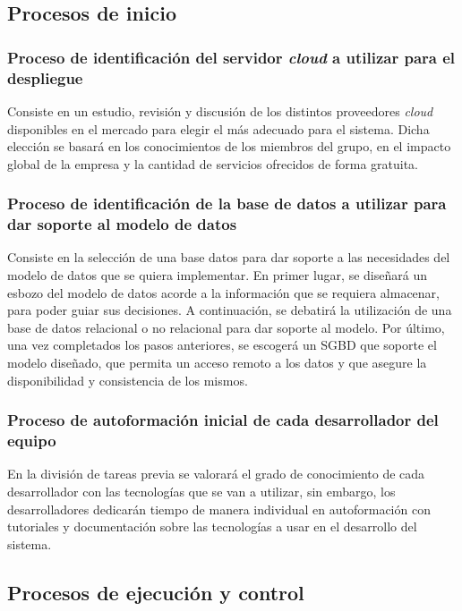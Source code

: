 \documentclass{article}
\begin{document}
\subsection{Procesos de inicio}

\subsubsection{Proceso de identificación del servidor \textit{cloud} a utilizar para el despliegue} \label{P.I.1}
Consiste en un estudio, revisión y discusión de los distintos proveedores \textit{cloud} disponibles en el mercado para elegir el más adecuado para el sistema. Dicha elección se basará en los conocimientos de los miembros del grupo, en el impacto global de la empresa y la cantidad de servicios ofrecidos de forma gratuita.

\subsubsection{Proceso de identificación de la base de datos a utilizar para dar soporte al modelo de datos} \label{P.I.2}
Consiste en la selección de una base datos para dar soporte a las necesidades del modelo de datos que se quiera implementar. En primer lugar, se diseñará un esbozo del modelo de datos acorde a la información que se requiera almacenar, para poder guiar sus decisiones. A continuación, se debatirá la utilización de una base de datos relacional o no relacional para dar soporte al modelo. Por último, una vez completados los pasos anteriores, se escogerá un SGBD que soporte el modelo diseñado, que permita un acceso remoto a los datos y que asegure la disponibilidad y consistencia de los mismos.

\subsubsection{Proceso de autoformación inicial de cada desarrollador del equipo} \label{P.I.3}
En la división de tareas previa se valorará el grado de conocimiento de cada desarrollador con las tecnologías que se van a utilizar, sin embargo, los desarrolladores dedicarán tiempo de manera individual en autoformación con tutoriales y documentación sobre las tecnologías a usar en el desarrollo del sistema.

\subsection{Procesos de ejecución y control}
\end{document}

